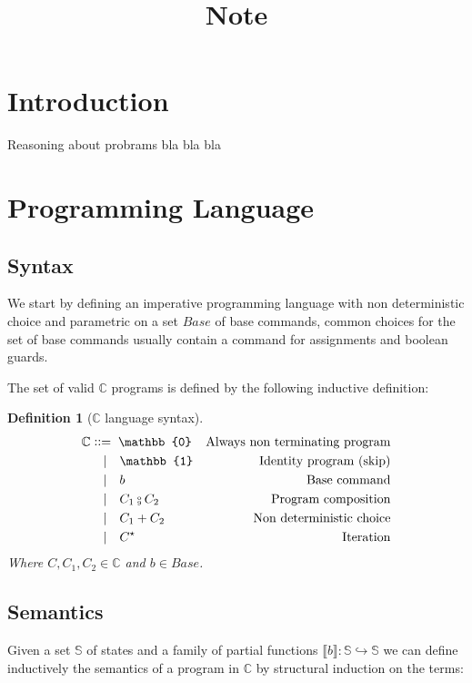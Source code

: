 \documentclass{article}
\title{Note}
\newtheorem{definition}{Definition}
\newcommand*{\sem}[1]{
    \llbracket #1 \rrbracket
}
\def\fcmp{\mathbin{\raise 0.6ex\hbox{\oalign{\hfil$\scriptscriptstyle      
    \mathrm{o}$\hfil\cr\hfil$\scriptscriptstyle\mathrm{9}$\hfil}}}}
\def\cceq{\mathrel{\vcenter{\hbox{::}}{=}}\;}
\def\smid{\quad|\quad}
\def\prr{\hookrightarrow}
\def\lang{\mathbb{C}}
\def\state{\mathbb{S}}
\begin{document}
\section{Introduction}
Reasoning about probrams bla bla bla

\section{Programming Language}

\subsection{Syntax}
    We start by defining an imperative programming language with non 
    deterministic choice and parametric on a set $Base$ of base commands,
    common choices for the set of base commands usually contain a command
    for assignments and boolean guards.

    The set of valid $\lang$ programs is defined by the following inductive 
    definition:
    \begin{definition}[$\lang$ language syntax]
        \begin{align*}
            \lang & \cceq \mathbb{0}    & \text{Always non terminating program} \\
                  & \smid \mathbb{1}    & \text{Identity program (skip)}\\
                  & \smid b             & \text{Base command}\\
                  & \smid C_1 \fcmp C_2 & \text{Program composition}\\
                  & \smid C_1 + C_2     & \text{Non deterministic choice}\\
                  & \smid C^\star       & \text{Iteration}\\
        \end{align*}
        Where $C, C_1, C_2 \in \lang$ and $b \in Base$.
    \end{definition}

\subsection{Semantics}
    Given a set $\state$ of states and a family of partial functions
    $\sem{b} : \state \prr \state$ we can define inductively the semantics
    of a program in $\lang$ by structural induction on the terms:
    
\end{document}
